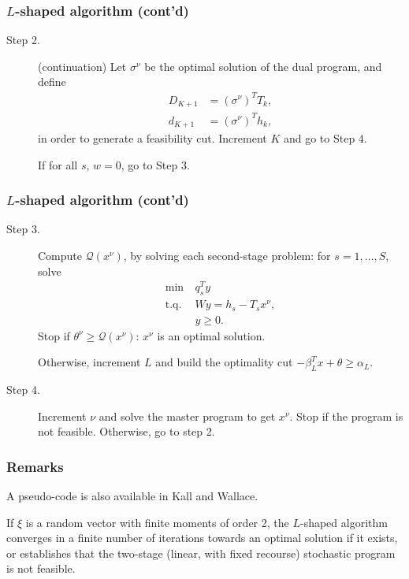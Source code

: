 \documentclass{beamer}
\begin{document}
\begin{frame}
\frametitle{$L$-shaped algorithm (cont'd)}
	
\begin{description}
\item[Step 2.] (continuation)
Let $\sigma^{\nu}$ be the optimal solution of the dual program, and define
\begin{align*}
D_{K+1} &= (\sigma^{\nu})^TT_k, \\
d_{K+1} &= (\sigma^{\nu})^Th_k,
\end{align*}
in order to generate a feasibility cut.
Increment $K$ and go to Step 4.

\mbox{}
		
If for all $s$, $w = 0$, go to Step 3.
\end{description}
	
\end{frame}

\begin{frame}
\frametitle{$L$-shaped algorithm (cont'd)}
	
\begin{description}
\item[Step 3.]
Compute $\mathcal{Q}(x^{\nu})$, by solving each second-stage problem: for $s = 1,\ldots,S$, solve
\begin{align*}
\min\ & q^T_sy \\
\mbox{t.q. } & Wy = h_s-T_sx^{\nu},\\
& y \geq 0.
\end{align*}
Stop if $\theta^{\nu} \geq \mathcal{Q}(x^{\nu})$: $x^{\nu}$ is an optimal solution.
		
Otherwise, increment $L$ and build the optimality cut $-\beta_L^T
x + \theta \geq \alpha_L$.
\item[Step 4.]
Increment $\nu$ and solve the master program to get $x^{\nu}$.
Stop if the program is not feasible. Otherwise, go to step 2.
\end{description}
	
\end{frame}

\begin{frame}
\frametitle{Remarks}

A pseudo-code is also available in Kall and Wallace.
	
	
	

\mbox{}
	
\begin{theorem}
If $\xi$ is a random vector with finite moments of order 2, the	$L$-shaped algorithm converges in a finite number of iterations towards an optimal solution if it exists, or establishes that the two-stage (linear, with fixed recourse) stochastic program is not feasible.
\end{theorem}
	
\end{frame}
\end{document}
